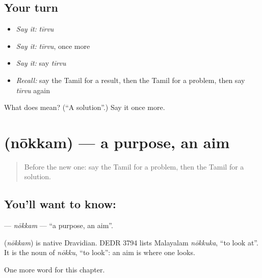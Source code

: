 \subsection*{Your turn}
\begin{itemize}
\raggedright
  \item \emph{Say it:} \emph{tīrvu}
  \item \emph{Say it:} \emph{tīrvu}, once more
  \item \emph{Say it:} say \emph{tīrvu}
  \item \emph{Recall:} say the Tamil for a result, then the Tamil for a problem, then say \emph{tīrvu} again
\end{itemize}

\begin{tcolorbox}[breakable,colback=teal!4,colframe=teal!35!black,title={Before you move on}]
What does  mean? (\textquotedblleft{}A solution\textquotedblright{}.) Say it once more.
\end{tcolorbox}
\section[\texorpdfstring{\ta{நோக்கம்} (nōkkam)}{நோக்கம் (nōkkam)}]{ (nōkkam) — a purpose, an aim}

\label{lesson:TA-C177-nokkam}



\begin{quote}
Before the new one: say the Tamil for a problem, then the Tamil for a solution.
\end{quote}

\subsection*{You'll want to know: }
\textbf{} — \emph{nōkkam} — \textquotedblleft{}a purpose, an aim\textquotedblright{}.

\begin{cousinweb}
\textbf{} (\emph{nōkkam}) is native Dravidian. DEDR 3794 lists Malayalam \emph{nōkkuka}, \textquotedblleft{}to look at\textquotedblright{}. It is the noun of \emph{nōkku}, \textquotedblleft{}to look\textquotedblright{}: an aim is where one looks.
\end{cousinweb}

\begin{grammarlens}[title={What you've built}]
One more word for this chapter.
\end{grammarlens}


